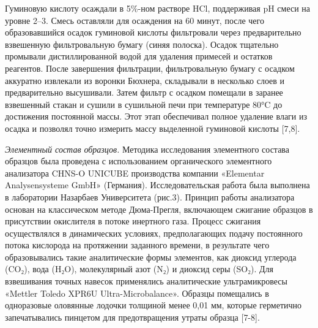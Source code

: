 \begin{multicols}{2}
Гуминовую кислоту осаждали в 5\%-ном растворе HCl, поддерживая pH смеси
на уровне 2--3. Смесь оставляли для осаждения на 60 минут, после чего
образовавшийся осадок гуминовой кислоты фильтровали через предварительно
взвешенную фильтровальную бумагу (синяя полоска). Осадок тщательно
промывали дистиллированной водой для удаления примесей и остатков
реагентов. После завершения фильтрации, фильтровальную бумагу с осадком
аккуратно извлекали из воронки Бюхнера, складывали в несколько слоев и
предварительно высушивали. Затем фильтр с осадком помещали в заранее
взвешенный стакан и сушили в сушильной печи при температуре 80°C до
достижения постоянной массы. Этот этап обеспечивал полное удаление влаги
из осадка и позволял точно измерить массу выделенной гуминовой кислоты
{[}7,8{]}.

\emph{Элементный состав образцов.} Методика исследования элементного
состава образцов была проведена с использованием органического
элементного анализатора CHNS-O UNICUBE производства компании «Elementar
Analysensysteme GmbH» (Германия). Исследовательская работа была
выполнена в лаборатории Назарбаев Университета (рис.3). Принцип работы
анализатора основан на классическом методе Дюма-Прегля, включающем
сжигание образцов в присутствии окислителя в потоке инертного газа.
Процесс сжигания осуществлялся в динамических условиях, предполагающих
подачу постоянного потока кислорода на протяжении заданного времени, в
результате чего образовывались такие аналитические формы элементов, как
диоксид углерода (CO₂), вода (H₂O), молекулярный азот (N₂) и диоксид
серы (SO₂). Для взвешивания точных навесок применялись аналитические
ультрамикровесы «Mettler Toledo XPR6U Ultra-Microbalance». Образцы
помещались в одноразовые оловянные лодочки толщиной менее 0,01 мм,
которые герметично запечатывались пинцетом для предотвращения утраты
образца {[}7-8{]}.
\end{multicols}

